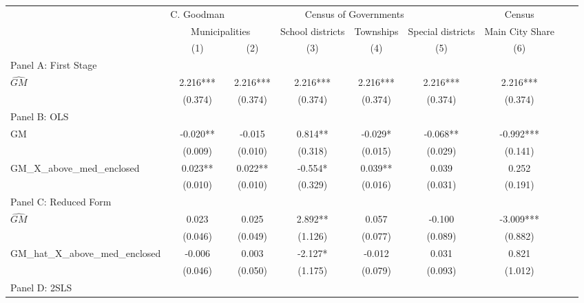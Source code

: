 \begin{tabular}{l*{8}{c}} \toprule
&\multicolumn{1}{c}{C. Goodman}&\multicolumn{4}{c}{Census of Governments}&\multicolumn{1}{c}{Census}\\\cmidrule(lr){2-2}\cmidrule(lr){3-6}\cmidrule(lr){7-7}
&\multicolumn{2}{c}{Municipalities}&\multicolumn{1}{c}{School districts}&\multicolumn{1}{c}{Townships}&\multicolumn{1}{c}{Special districts}&\multicolumn{1}{c}{Main City Share}\\\cmidrule(lr){2-3}\cmidrule(lr){4-6}\cmidrule(lr){7-7}
&\multicolumn{1}{c}{(1)}&\multicolumn{1}{c}{(2)}&\multicolumn{1}{c}{(3)}&\multicolumn{1}{c}{(4)}&\multicolumn{1}{c}{(5)}&\multicolumn{1}{c}{(6)}\\
\cmidrule(lr){1-7}
\multicolumn{6}{l}{Panel A: First Stage}\\
\cmidrule(lr){1-7}
$\widehat{GM}$  &    2.216***&    2.216***&    2.216***&    2.216***&    2.216***&    2.216***\\
                &  (0.374)   &  (0.374)   &  (0.374)   &  (0.374)   &  (0.374)   &  (0.374)   \\
\cmidrule(lr){1-7}
\multicolumn{6}{l}{Panel B: OLS}\\
\cmidrule(lr){1-7}
GM              &   -0.020** &   -0.015   &    0.814** &   -0.029*  &   -0.068** &   -0.992***\\
                &  (0.009)   &  (0.010)   &  (0.318)   &  (0.015)   &  (0.029)   &  (0.141)   \\
\addlinespace
GM\_X\_above\_med\_enclosed&    0.023** &    0.022** &   -0.554*  &    0.039** &    0.039   &    0.252   \\
                &  (0.010)   &  (0.010)   &  (0.329)   &  (0.016)   &  (0.031)   &  (0.191)   \\
\cmidrule(lr){1-7}
\multicolumn{6}{l}{Panel C: Reduced Form}\\
\cmidrule(lr){1-7}
$\widehat{GM}$  &    0.023   &    0.025   &    2.892** &    0.057   &   -0.100   &   -3.009***\\
                &  (0.046)   &  (0.049)   &  (1.126)   &  (0.077)   &  (0.089)   &  (0.882)   \\
\addlinespace
GM\_hat\_X\_above\_med\_enclosed&   -0.006   &    0.003   &   -2.127*  &   -0.012   &    0.031   &    0.821   \\
                &  (0.046)   &  (0.050)   &  (1.175)   &  (0.079)   &  (0.093)   &  (1.012)   \\
\cmidrule(lr){1-7}
\multicolumn{6}{l}{Panel D: 2SLS}\\

\end{tabular}
